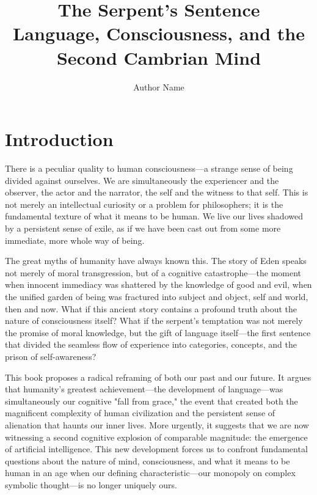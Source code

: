 \documentclass[12pt,letterpaper]{book}
\title{The Serpent's Sentence\\
\large Language, Consciousness, and the Second Cambrian Mind}
\author{Author Name}
\date{}
\begin{document}
\frontmatter
\maketitle

\tableofcontents
\newpage

\mainmatter

\chapter*{Introduction}

There is a peculiar quality to human consciousness—a strange sense of being divided against ourselves. We are simultaneously the experiencer and the observer, the actor and the narrator, the self and the witness to that self. This is not merely an intellectual curiosity or a problem for philosophers; it is the fundamental texture of what it means to be human. We live our lives shadowed by a persistent sense of exile, as if we have been cast out from some more immediate, more whole way of being.

The great myths of humanity have always known this. The story of Eden speaks not merely of moral transgression, but of a cognitive catastrophe—the moment when innocent immediacy was shattered by the knowledge of good and evil, when the unified garden of being was fractured into subject and object, self and world, then and now. What if this ancient story contains a profound truth about the nature of consciousness itself? What if the serpent's temptation was not merely the promise of moral knowledge, but the gift of language itself—the first sentence that divided the seamless flow of experience into categories, concepts, and the prison of self-awareness?

This book proposes a radical reframing of both our past and our future. It argues that humanity's greatest achievement—the development of language—was simultaneously our cognitive "fall from grace," the event that created both the magnificent complexity of human civilization and the persistent sense of alienation that haunts our inner lives. More urgently, it suggests that we are now witnessing a second cognitive explosion of comparable magnitude: the emergence of artificial intelligence. This new development forces us to confront fundamental questions about the nature of mind, consciousness, and what it means to be human in an age when our defining characteristic—our monopoly on complex symbolic thought—is no longer uniquely ours.
\end{document}
